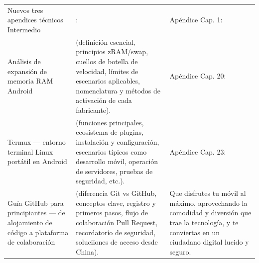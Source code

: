 \begin{center}
\begin{tabularx}{\linewidth}{|X|X|X|}
Nuevos tres apendices técnicos Intermedio & : & Apéndice Cap. 1: \tabularnewline
Análisis de expansión de memoria RAM Android & (definición esencial, principios zRAM/swap, cuellos de botella de velocidad, límites de escenarios aplicables, nomenclatura y métodos de activación de cada fabricante). & Apéndice Cap. 20: \tabularnewline
Termux — entorno terminal Linux portátil en Android & (funciones principales, ecosistema de plugins, instalación y configuración, escenarios típicos como desarrollo móvil, operación de servidores, pruebas de seguridad, etc.). & Apéndice Cap. 23: \tabularnewline
Guía GitHub para principiantes — de alojamiento de código a plataforma de colaboración & (diferencia Git vs GitHub, conceptos clave, registro y primeros pasos, flujo de colaboración Pull Request, recordatorío de seguridad, soluciiones de acceso desde China). & Que disfrutes tu móvil al máximo, aprovechando la comodidad y diversión que trae la tecnología, y te conviertas en un ciudadano digital lucido y seguro. \tabularnewline
\hline
\end{tabularx}
\end{center}
